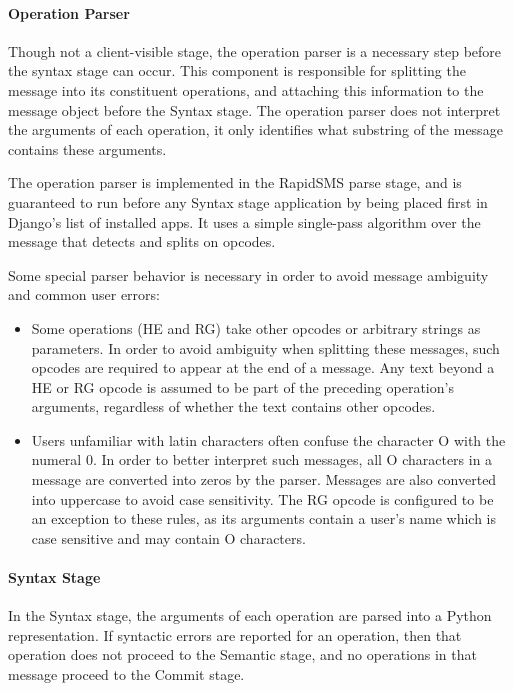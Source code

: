 \documentclass{acm_proc_article-sp}
\begin{document}
\paragraph{Operation Parser}

Though not a client-visible stage, the operation parser is a necessary step before the syntax stage can occur. This component is responsible for splitting the message into its constituent operations, and attaching this information to the message object before the Syntax stage. The operation parser does not interpret the arguments of each operation, it only identifies what substring of the message contains these arguments.

The operation parser is implemented in the RapidSMS parse stage, and is guaranteed to run before any Syntax stage application by being placed first in Django’s list of installed apps. It uses a simple single-pass algorithm over the message that detects and splits on opcodes.

Some special parser behavior is necessary in order to avoid message ambiguity and common user errors:

\begin{itemize}
\item Some operations (HE and RG) take other opcodes or arbitrary strings as parameters. In order to avoid ambiguity when splitting these messages, such opcodes are required to appear at the end of a message. Any text beyond a HE or RG opcode is assumed to be part of the preceding operation’s arguments, regardless of whether the text contains other opcodes.
\item Users unfamiliar with latin characters often confuse the character O with the numeral 0. In order to better interpret such messages, all O characters in a message are converted into zeros by the parser. Messages are also converted into uppercase to avoid case sensitivity. The RG opcode is configured to be an exception to these rules, as its arguments contain a user’s name which is case sensitive and may contain O characters.
\end{itemize}

\paragraph{Syntax Stage}

In the Syntax stage, the arguments of each operation are parsed into a Python representation. If syntactic errors are reported for an operation, then that operation does not proceed to the Semantic stage, and no operations in that message proceed to the Commit stage.
\end{document}
